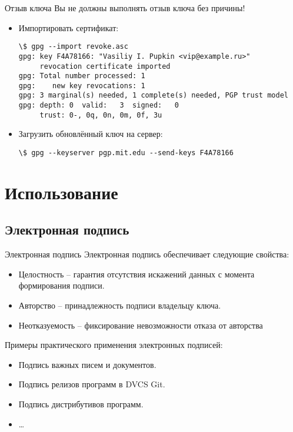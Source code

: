 \documentclass[presentation]{beamer}
\begin{document}
\begin{frame}[fragile]{Отзыв ключа}
  \alert{Вы не должны выполнять отзыв ключа без причины!}\newline

  \begin{itemize}
  \item Импортировать сертификат:
    \footnotesize
\begin{Verbatim}[commandchars=\\\[\]]
\$ gpg --import revoke.asc
gpg: key F4A78166: "Vasiliy I. Pupkin <vip@example.ru>"
     revocation certificate imported
gpg: Total number processed: 1
gpg:    new key revocations: 1
gpg: 3 marginal(s) needed, 1 complete(s) needed, PGP trust model
gpg: depth: 0  valid:   3  signed:   0
     trust: 0-, 0q, 0n, 0m, 0f, 3u
\end{Verbatim}
    \normalsize
  \item Загрузить обновлённый ключ на сервер:
    \footnotesize
\begin{Verbatim}[commandchars=\\\[\]]
\$ gpg --keyserver pgp.mit.edu --send-keys F4A78166
\end{Verbatim}
    \normalsize
  \end{itemize}
\end{frame}



\section{Использование}


\subsection{Электронная подпись}

\begin{frame}[fragile]{Электронная подпись}
  Электронная подпись обеспечивает следующие свойства:
  \begin{itemize}
  \item \alert{Целостность} -- гарантия отсутствия искажений данных с
    момента формирования подписи.
  \item \alert{Авторство} -- принадлежность подписи владельцу ключа.
  \item \alert{Неотказуемость} -- фиксирование невозможности отказа от
    авторства
  \end{itemize}

  \vspace{5 mm}

  Примеры практического применения электронных подписей:
  \begin{itemize}
  \item Подпись важных писем и документов.
  \item Подпись релизов программ в DVCS Git.
  \item Подпись дистрибутивов программ.
  \item \ldots{}
  \end{itemize}
\end{frame}
\end{document}
